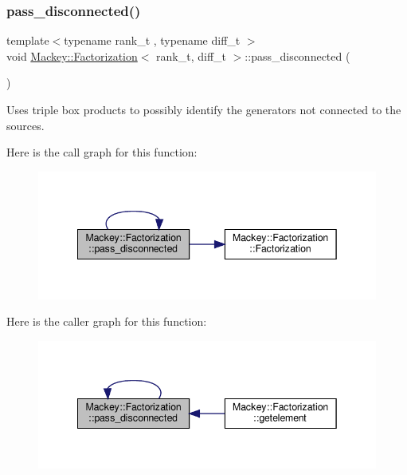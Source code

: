 \subsubsection{\texorpdfstring{pass\+\_\+disconnected()}{pass\_disconnected()}\hspace{0.1cm}{\footnotesize\ttfamily [2/2]}}
{\footnotesize\ttfamily template$<$typename rank\+\_\+t , typename diff\+\_\+t $>$ \\
void \hyperlink{classMackey_1_1Factorization}{Mackey\+::\+Factorization}$<$ rank\+\_\+t, diff\+\_\+t $>$\+::pass\+\_\+disconnected (\begin{DoxyParamCaption}{ }\end{DoxyParamCaption})\hspace{0.3cm}{\ttfamily [inline]}}



Uses triple box products to possibly identify the generators not connected to the sources. 

Here is the call graph for this function\+:\nopagebreak
\begin{figure}[H]
\begin{center}
\leavevmode
\includegraphics[width=342pt]{classMackey_1_1Factorization_a28a789ea46909c33da8958bc1d17c127_cgraph}
\end{center}
\end{figure}
Here is the caller graph for this function\+:\nopagebreak
\begin{figure}[H]
\begin{center}
\leavevmode
\includegraphics[width=342pt]{classMackey_1_1Factorization_a28a789ea46909c33da8958bc1d17c127_icgraph}
\end{center}
\end{figure}
\mbox{\label{classMackey_1_1Factorization_a3302694fa01f5fe9182b18be30e0411d}} 
